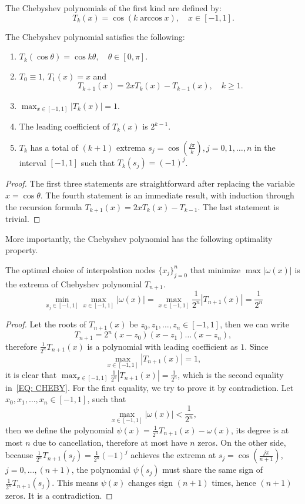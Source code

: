 \begin{definition}
    The Chebyshev polynomials of the first kind are defined by: 
    $$T_k(x) = \cos (k\arccos x),\quad x\in[-1,1].$$
\end{definition}
\begin{theorem}
\label{Thm: 2-Che-Pro}
    The Chebyshev polynomial satisfies the following: 
    \begin{enumerate}
        \item $T_k(\cos\theta) = \cos k\theta, \quad \theta\in [0, \pi]$.
        \item $T_0 \equiv 1$, $T_1(x) = x$ and 
        $$T_{k+1}(x) = 2 x T_{k}(x) - T_{k-1}(x), \quad k\ge 1.$$
        \item $\max_{x\in[-1,1]} |T_k(x)| = 1$.
        \item The leading coefficient of $T_k(x)$ is $2^{k-1}$.
        \item $T_k$ has a total of $(k+1)$ extrema $s_j = \cos(\frac{j\pi}{k}), j = 0, 1,\dots, n$ in the interval $[-1,1]$ such that $T_k(s_j) = (-1)^j$.
    \end{enumerate}
\end{theorem}
\begin{proof}
    The first three statements are straightforward after replacing the variable $x = \cos\theta$. The fourth statement is an immediate result, with induction through the recursion formula 
    $T_{k+1}(x) = 2 x T_k(x) - T_{k-1}$. The last statement is trivial.
\end{proof}
More importantly, the Chebyshev polynomial has the following optimality property. 
\begin{theorem}
\label{Thm: 2-Che-opt}
    The optimal choice of interpolation nodes $\{x_j\}_{j=0}^{n}$ that minimize $\max |\omega(x)|$ is the extrema of Chebyshev polynomial $T_{{n+1}}$.
    \begin{equation}\label{EQ: CHEBY}
        \min_{x_j\in[-1,1]} \max_{x\in[-1,1]} |\omega(x)| =   \max_{x\in[-1,1]} \frac{1}{2^n}|T_{n+1}(x)|  = \frac{1}{2^n}
    \end{equation}
\end{theorem}
\begin{proof}
    Let the roots of $T_{n+1}(x)$ be $z_0, z_1, \dots, z_{n}\in [-1, 1]$, then we can write 
    $$T_{n+1} = 2^{n}(x - z_0)(x-z_1)\dots (x - z_{n}),$$
    therefore $\frac{1}{2^n} T_{n+1}(x)$ is a polynomial with leading coefficient as $1$. Since $$\max_{x\in[-1,1]} |T_{n+1}(x)| = 1,$$ it is clear that $\max_{x\in [-1,1]} \frac{1}{2^n}|T_{n+1}(x)| = \frac{1}{2^n}$, which is the second equality in~\eqref{EQ: CHEBY}. For the first equality, we try to prove it by contradiction. Let $x_0, x_1, \dots, x_n\in [-1, 1]$, such that 
    $$\max_{x\in[-1,1]}|\omega(x)| < \frac{1}{2^n},$$
    then we define the polynomial $\psi(x) = \frac{1}{2^n}T_{n+1}(x)- \omega(x)$, its degree is at most $n$ due to cancellation, therefore at most have $n$ zeros. On the other side, because $\frac{1}{2^n}T_{n+1}(s_j) = \frac{1}{2^n}(-1)^j$ achieves the extrema at $s_j = \cos(\frac{j\pi}{n+1})$, $j=0,\dots, (n+1)$, the polynomial $\psi(s_j)$ must share the same sign of $\frac{1}{2^n}T_{n+1}(s_j)$. This means $\psi(x)$ changes sign $(n+1)$ times, hence $(n+1)$ zeros. It is a contradiction.
\end{proof}

